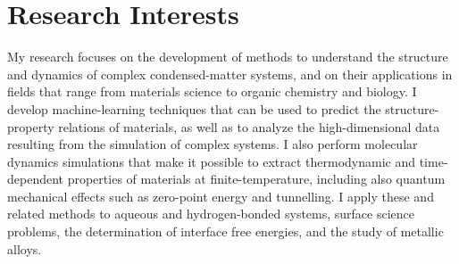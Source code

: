 \section{Research Interests}
My research focuses on the development of methods to understand
the structure and dynamics of complex condensed-matter systems,
and on their applications in fields that range from materials
science to organic chemistry and biology. I develop machine-learning
techniques that can be used to predict the structure-property relations
of materials, as well as to analyze the high-dimensional data resulting
from the simulation of complex systems. I also perform molecular
dynamics simulations that make it possible to extract thermodynamic and
time-dependent properties of materials at finite-temperature, including
also quantum mechanical effects such as zero-point energy and tunnelling.
I apply these and related methods to aqueous and hydrogen-bonded systems,
surface science problems, the determination of interface free energies,
and the study of metallic alloys.

